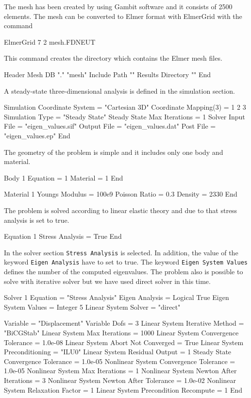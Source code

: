 The mesh has been created by using Gambit software and it consists of 2500 elements. The mesh can be converted to Elmer format with ElmerGrid with the command

\ttbegin
ElmerGrid 7 2 mesh.FDNEUT
\ttend

\begin{flushleft}
This command creates the directory which contains the Elmer mesh files.


\ttbegin
Header
  Mesh DB "." "mesh"
  Include Path ""
  Results Directory ""
End
\ttend

A steady-state three-dimensional analysis is defined in the simulation section.

\ttbegin
Simulation
  Coordinate System = "Cartesian 3D"
  Coordinate Mapping(3) = 1 2 3
  Simulation Type = "Steady State"
  Steady State Max Iterations = 1
  Solver Input File = "eigen_values.sif"
  Output File = "eigen_values.dat"
  Post File = "eigen_values.ep"
End
\ttend 

The geometry of the problem is simple and it includes only one body and material. 

\ttbegin
Body 1
  Equation = 1
  Material = 1
End

Material 1
  Youngs Modulus = 100e9
  Poisson Ratio = 0.3
  Density = 2330
End
\ttend

The problem is solved according to linear elastic theory and due to that stress analysis is set to true.

\ttbegin
Equation 1
  Stress Analysis = True
End
\ttend

In the solver section {\tt Stress Analysis} is selected. In addition, the value of the keyword 
{\tt Eigen Analysis} have to set to true. The keyword {\tt Eigen System Values} defines the number of the computed eigenvalues. The problem also is possible to solve with iterative solver but we have used direct solver in this time.

\ttbegin
Solver 1
  Equation = "Stress Analysis"
  Eigen Analysis = Logical True
  Eigen System Values = Integer 5
  Linear System Solver = "direct"

  Variable = "Displacement"
  Variable Dofs = 3
  Linear System Iterative Method = "BiCGStab"
  Linear System Max Iterations = 1000
  Linear System Convergence Tolerance = 1.0e-08
  Linear System Abort Not Converged = True
  Linear System Preconditioning = "ILU0"
  Linear System Residual Output = 1
  Steady State Convergence Tolerance = 1.0e-05
  Nonlinear System Convergence Tolerance = 1.0e-05
  Nonlinear System Max Iterations = 1
  Nonlinear System Newton After Iterations = 3
  Nonlinear System Newton After Tolerance = 1.0e-02
  Nonlinear System Relaxation Factor = 1
  Linear System Precondition Recompute = 1
End
\ttend


\end{flushleft}
